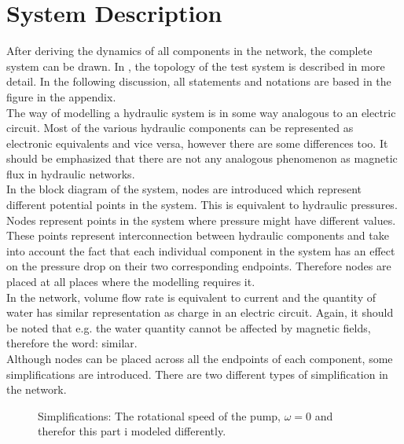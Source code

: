 \section{System Description}  
\label{SystemModel}

After deriving the dynamics of all components in the network, the complete system can be drawn. In , the topology of the test system is described in more detail. In the following discussion, all statements and notations are based in the figure in the appendix. 
\\
The way of modelling a hydraulic system is in some way analogous to an electric circuit. Most of the various hydraulic components can be represented as electronic equivalents and vice versa, however there are some differences too. It should be emphasized that there are not any analogous phenomenon as magnetic flux in hydraulic networks. 
\\
In the block diagram of the system, nodes are introduced which represent different potential points in the system. This is equivalent to hydraulic pressures. Nodes represent points in the system where pressure might have different values. These points represent interconnection between hydraulic components and take into account the fact that each individual component in the system has an effect on the pressure drop on their two corresponding endpoints. Therefore nodes are placed at all places where the modelling requires it. 
\\
In the network, volume flow rate is equivalent to current and the quantity of water has similar representation as charge in an electric circuit. Again, it should be noted that e.g. the water quantity cannot be affected by magnetic fields, therefore the word: similar.
\\ 
Although nodes can be placed across all the endpoints of each component, some simplifications are introduced. There are two different types of simplification in the network. %


\begin{figure}[H]
\centering
   
  \label{fig:subsys_1}
%   
\caption{Simplifications: The rotational speed of the pump, $\omega = 0$ and therefor this part i modeled differently.}
\end{figure}

